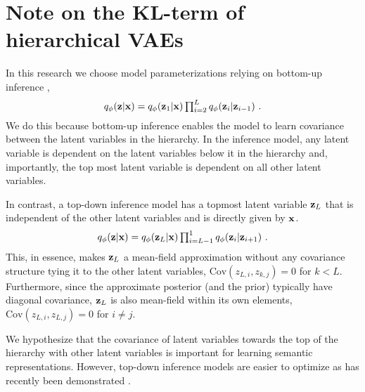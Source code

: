 {    %


\section{Note on the KL-term of hierarchical VAEs}
In this research we choose model parameterizations relying on bottom-up inference \parencite{burda_importance_2016},
\begin{equation}
    q_\phi(\zb|\xb) = q_\phi(\zb_1|\xb)\textstyle\prod_{i=2}^{L} q_\phi(\zb_i|\zb_{i-1}) \ .
\end{equation}
We do this because bottom-up inference enables the model to learn covariance between the latent variables in the hierarchy.
In the inference model, any latent variable is dependent on the latent variables below it in the hierarchy and, importantly, the top most latent variable is dependent on all other latent variables.

In contrast, a top-down inference model \parencite{sonderby_ladder_2016} has a topmost latent variable ${\mathbf{z}}_L$ that is independent of the other latent variables and is directly given by ${\mathbf{x}}$.
\begin{equation}
    q_\phi(\zb|\xb) = q_\phi(\zb_L|\xb)\textstyle\prod_{i=L-1}^{1} q_\phi(\zb_{i}|\zb_{i+1}) \ .
\end{equation}
This, in essence, makes ${\mathbf{z}}_L$ a mean-field approximation without any covariance structure tying it to the other latent variables, $\text{Cov}(z_{L,i}, z_{k,j})=0$ for $k<L$.
Furthermore, since the approximate posterior (and the prior) typically have diagonal covariance, ${\mathbf{z}}_L$ is also mean-field within its own elements, $\text{Cov}(z_{L,i}, z_{L,j})=0$ for $i\ne j$.

We hypothesize that the covariance of latent variables towards the top of the hierarchy with other latent variables is important for learning semantic representations.
However, top-down inference models are easier to optimize as has recently been demonstrated \parencite{sonderby_ladder_2016, vahdat_nvae_2020, child_very_2021}.

}
